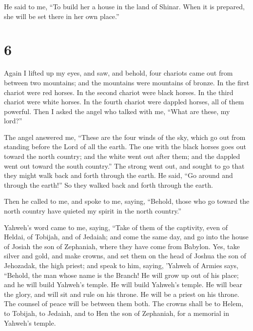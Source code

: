  He said to me, ``To build her a house in the land of
Shinar. When it is prepared, she will be set there in her own place.''

\hypertarget{section-5}{%
\section{6}\label{section-5}}

 Again I lifted up my eyes, and saw, and behold, four
chariots came out from between two mountains; and the mountains were
mountains of bronze.  In the first chariot were red
horses. In the second chariot were black horses.  In the
third chariot were white horses. In the fourth chariot were dappled
horses, all of them powerful.  Then I asked the angel who
talked with me, ``What are these, my lord?''

 The angel answered me, ``These are the four winds of the
sky, which go out from standing before the Lord of all the earth.
 The one with the black horses goes out toward the north
country; and the white went out after them; and the dappled went out
toward the south country.''  The strong went out, and
sought to go that they might walk back and forth through the earth. He
said, ``Go around and through the earth!'' So they walked back and forth
through the earth.

 Then he called to me, and spoke to me, saying, ``Behold,
those who go toward the north country have quieted my spirit in the
north country.''

 Yahweh's word came to me, saying,  ``Take
of them of the captivity, even of Heldai, of Tobijah, and of Jedaiah;
and come the same day, and go into the house of Josiah the son of
Zephaniah, where they have come from Babylon.  Yes, take
silver and gold, and make crowns, and set them on the head of Joshua the
son of Jehozadak, the high priest;  and speak to him,
saying, 'Yahweh of Armies says, ``Behold, the man whose name is the
Branch! He will grow up out of his place; and he will build Yahweh's
temple.  He will build Yahweh's temple. He will bear the
glory, and will sit and rule on his throne. He will be a priest on his
throne. The counsel of peace will be between them both. 
The crowns shall be to Helem, to Tobijah, to Jedaiah, and to Hen the son
of Zephaniah, for a memorial in Yahweh's temple.

